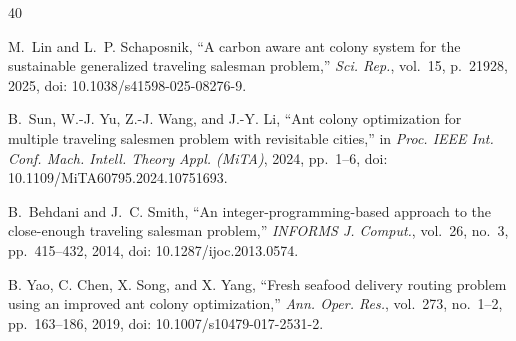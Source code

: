 \documentclass[lettersize,journal]{IEEEtran}
\begin{document}
\begin{thebibliography}{40}

M.~Lin and L.~P. Schaposnik, ``A carbon aware ant colony system for the sustainable generalized traveling salesman problem,'' \textit{Sci. Rep.}, vol.~15, p.~21928, 2025, doi: 10.1038/s41598-025-08276-9.



B.~Sun, W.-J. Yu, Z.-J. Wang, and J.-Y. Li, ``Ant colony optimization for multiple traveling salesmen problem with revisitable cities,'' in \textit{Proc. IEEE Int. Conf. Mach. Intell. Theory Appl. (MiTA)}, 2024, pp.~1--6, doi: 10.1109/MiTA60795.2024.10751693.



B.~Behdani and J.~C. Smith, ``An integer-programming-based approach to the close-enough traveling salesman problem,'' \textit{INFORMS J. Comput.}, vol.~26, no.~3, pp.~415--432, 2014, doi: 10.1287/ijoc.2013.0574.



B. Yao, C. Chen, X. Song, and X. Yang, ``Fresh seafood delivery routing problem using an improved ant colony optimization,'' \textit{Ann. Oper. Res.}, vol.~273, no.~1--2, pp.~163--186, 2019, doi: 10.1007/s10479-017-2531-2.

\end{thebibliography}
\end{document}
